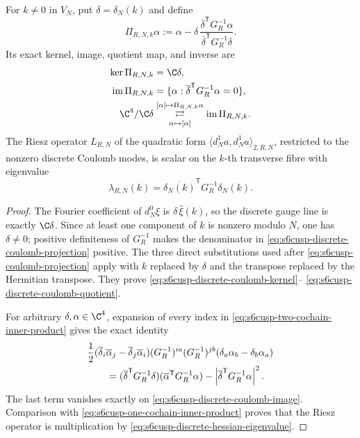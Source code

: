 \begin{theorem}
\label{thm:s6cusp-discrete-gauge-spectrum}
For \(k\ne0\) in \(V_N\), put \(\delta=\delta_N(k)\) and define
\begin{equation}\label{eq:s6cusp-discrete-coulomb-projection}
 \Pi_{R,N,k}\alpha:=
 \alpha-\delta\,
 \frac{\overline\delta^{\mathsf T}G_R^{-1}\alpha}
 {\overline\delta^{\mathsf T}G_R^{-1}\delta}.
\end{equation}
Its exact kernel, image, quotient map, and inverse are
\begin{align}
 \ker\Pi_{R,N,k}&=\C\delta,
 \label{eq:s6cusp-discrete-coulomb-kernel}\\
 \operatorname{im}\Pi_{R,N,k}
 &=\{\alpha:\overline\delta^{\mathsf T}G_R^{-1}\alpha=0\},
 \label{eq:s6cusp-discrete-coulomb-image}\\
 \C^4/\C\delta
 &\underset{\alpha\mapsto[\alpha]}{\overset{[\alpha]\mapsto
 \Pi_{R,N,k}\alpha}{\rightleftarrows}}
 \operatorname{im}\Pi_{R,N,k}.
 \label{eq:s6cusp-discrete-coulomb-quotient}
\end{align}
The Riesz operator \(L_{R,N}\) of the quadratic form
\(\langle d_N^1a,d_N^1a\rangle_{2,R,N}\), restricted to the nonzero
discrete Coulomb modes, is scalar on the \(k\)-th transverse fibre with
eigenvalue
\begin{equation}\label{eq:s6cusp-discrete-hessian-eigenvalue}
 \lambda_{R,N}(k)=
 \overline{\delta_N(k)}^{\mathsf T}
 G_R^{-1}\delta_N(k).
\end{equation}
\end{theorem}

\begin{proof}
The Fourier coefficient of \(d_N^0\xi\) is \(\delta\,\widehat\xi(k)\), so
the discrete gauge line is exactly \(\C\delta\).  Since at least one
component of \(k\) is nonzero modulo \(N\), one has \(\delta\ne0\); positive
definiteness of \(G_R^{-1}\) makes the denominator in
\eqref{eq:s6cusp-discrete-coulomb-projection} positive.  The three direct
substitutions used after \eqref{eq:s6cusp-coulomb-projection} apply with
\(k\) replaced by \(\delta\) and the transpose replaced by the Hermitian
transpose.  They prove \eqref{eq:s6cusp-discrete-coulomb-kernel}--
\eqref{eq:s6cusp-discrete-coulomb-quotient}.

For arbitrary \(\delta,\alpha\in\C^4\), expansion of every index in
\eqref{eq:s6cusp-two-cochain-inner-product} gives the exact identity
\begin{align}
 &\frac12
 (\overline\delta_i\overline\alpha_j
  -\overline\delta_j\overline\alpha_i)
 (G_R^{-1})^{ia}(G_R^{-1})^{jb}
 (\delta_a\alpha_b-\delta_b\alpha_a)
 \notag\\
 &\qquad=
 (\overline\delta^{\mathsf T}G_R^{-1}\delta)
 (\overline\alpha^{\mathsf T}G_R^{-1}\alpha)
 -
 \left|\overline\delta^{\mathsf T}G_R^{-1}\alpha\right|^2.
 \label{eq:s6cusp-discrete-wedge-identity}
\end{align}
The last term vanishes exactly on
\eqref{eq:s6cusp-discrete-coulomb-image}.  Comparison with
\eqref{eq:s6cusp-one-cochain-inner-product} proves that the Riesz operator
is multiplication by \eqref{eq:s6cusp-discrete-hessian-eigenvalue}.
\end{proof}

